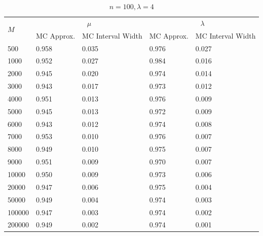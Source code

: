 \documentclass{article}
\begin{document}
       \begin{table}[!htb]
       \ContinuedFloat
		\begin{subtable}[b]{\textwidth}
		\centering
		\begin{tabular}{l|ll|ll}
		\toprule
        \multirow{2}{*}{$M$} & \multicolumn{2}{c|}{$\mu$}      & \multicolumn{2}{c}{$\lambda$}  \\ 
                           & MC Approx. & MC Interval Width & MC Approx. & MC Interval Width \\
                           \midrule
        500    &0.958 &0.035 &0.976 &0.027\\
        1000   &0.952 &0.027 &0.984 &0.016\\
        2000   &0.945 &0.020 &0.974 &0.014\\
        3000   &0.943 &0.017 &0.973 &0.012\\
        4000   &0.951 &0.013 &0.976 &0.009\\
        5000   &0.945 &0.013 &0.972 &0.009\\
        6000   &0.943 &0.012 &0.974 &0.008\\
        7000   &0.953 &0.010 &0.976 &0.007\\
        8000   &0.949 &0.010 &0.975 &0.007\\
        9000   &0.951 &0.009 &0.970 &0.007\\
        10000  &0.950 &0.009 &0.973 &0.006\\
        20000  &0.947 &0.006 &0.975 &0.004\\
        50000  &0.949 &0.004 &0.974 &0.003\\
        100000 &0.947 &0.003 &0.974 &0.002\\
        200000 &0.949 &0.002 &0.974 &0.001\\
       \bottomrule
       \end{tabular}
       \caption{$n = 100, \lambda = 4$}
       \end{subtable}
	\end{table}
\end{document}

